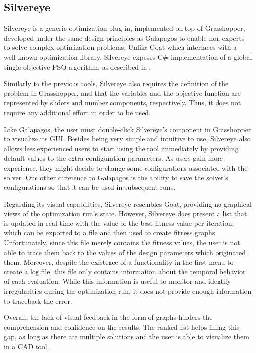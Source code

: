 	
	\subsection{Silvereye}
	Silvereye is a generic optimization plug-in, implemented on top of Grasshopper, developed under the same design principles as Galapagos to enable non-experts to solve complex optimization problems. Unlike Goat which interfaces with a well-known optimization library, Silvereye exposes C\# implementation of a global single-objective \ac{PSO} algorithm, as described in \cite{Cichocka2017SILVEREYE}. 
	
	Similarly to the previous tools, Silvereye also requires the definition of the problem in Grasshopper, and that the variables and the objective function are represented by sliders and number components, respectively. Thus, it does not require any additional effort in order to be used.
	
	Like Galapagos, the user must double-click Silvereye's component in Grasshopper to visualize its \ac{GUI}. Besides being very simple and intuitive to use, Silvereye also allows less experienced users to start using the tool immediately by providing default values to the extra configuration parameters. As users gain more experience, they might decide to change some configurations associated with the solver. One other difference to Galapagos is the ability to save the solver's configurations so that it can be used in subsequent runs.
	
	Regarding its visual capabilities, Silvereye resembles Goat, providing no graphical views of the optimization run's state. However, Silvereye does present a list that is updated in real-time with the value of the best fitness value per iteration, which can be exported to a file and then used to create fitness graphs. Unfortunately, since this file merely contains the fitness values, the user is not able to trace them back to the values of the design parameters which originated them. Moreover, despite the existence of a functionality in the first menu to create a log file, this file only contains information about the temporal behavior of each evaluation. While this information is useful to monitor and identify irregularities during the optimization run, it does not provide enough information to traceback the error. 
	
	Overall, the lack of visual feedback in the form of graphs hinders the comprehension and confidence on the results. The ranked list helps filling this gap, as long as there are multiple solutions and the user is able to visualize them in a \ac{CAD} tool.
	
